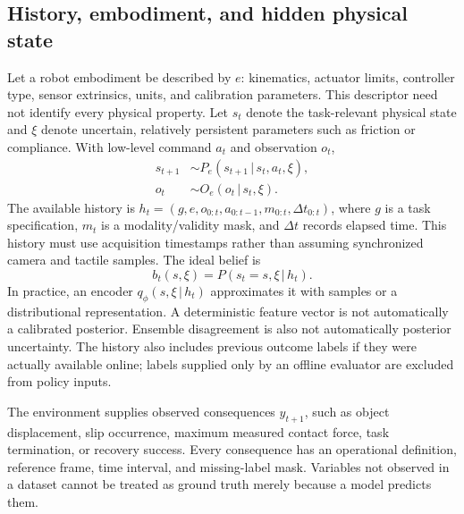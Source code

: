 \documentclass[11pt]{article}
\newcommand{\given}{\,\vert\,}
\begin{document}
\subsection{History, embodiment, and hidden physical state}
Let a robot embodiment be described by $e$: kinematics, actuator limits, controller type, sensor extrinsics, units, and calibration parameters. This descriptor need not identify every physical property. Let $s_t$ denote the task-relevant physical state and $\xi$ denote uncertain, relatively persistent parameters such as friction or compliance. With low-level command $a_t$ and observation $o_t$,
\begin{align}
s_{t+1} &\sim P_e(s_{t+1}\given s_t,a_t,\xi),\\
o_t &\sim O_e(o_t\given s_t,\xi).
\end{align}
The available history is $h_t=(g,e,o_{0:t},a_{0:t-1},m_{0:t},\Delta t_{0:t})$, where $g$ is a task specification, $m_t$ is a modality/validity mask, and $\Delta t$ records elapsed time. This history must use acquisition timestamps rather than assuming synchronized camera and tactile samples. The ideal belief is
\begin{equation}
b_t(s,\xi)=P(s_t=s,\xi\given h_t).
\end{equation}
In practice, an encoder $q_\phi(s,\xi\given h_t)$ approximates it with samples or a distributional representation. A deterministic feature vector is not automatically a calibrated posterior. Ensemble disagreement is also not automatically posterior uncertainty. The history also includes previous outcome labels if they were actually available online; labels supplied only by an offline evaluator are excluded from policy inputs.

The environment supplies observed consequences $y_{t+1}$, such as object displacement, slip occurrence, maximum measured contact force, task termination, or recovery success. Every consequence has an operational definition, reference frame, time interval, and missing-label mask. Variables not observed in a dataset cannot be treated as ground truth merely because a model predicts them.
\end{document}
